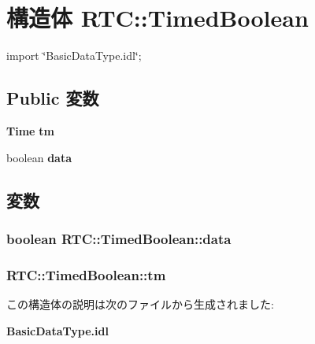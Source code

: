 \section{構造体 RTC::TimedBoolean}
\label{structRTC_1_1TimedBoolean}


{\ttfamily import \char`\"{}BasicDataType.idl\char`\"{};}

\subsection*{Public 変数}
\begin{DoxyCompactItemize}
\item 
{\bf Time} {\bf tm}
\item 
boolean {\bf data}
\end{DoxyCompactItemize}


\subsection{変数}
\subsubsection[{data}]{\setlength{\rightskip}{0pt plus 5cm}boolean {\bf RTC::TimedBoolean::data}}\label{structRTC_1_1TimedBoolean_a13a5e2dcf6f1f84895268e835a1a504c}
\subsubsection[{tm}]{ {\bf RTC::TimedBoolean::tm}}\label{structRTC_1_1TimedBoolean_aa07e1f41460e4542fe94af48e0e0135e}


この構造体の説明は次のファイルから生成されました:\begin{DoxyCompactItemize}
\item 
{\bf BasicDataType.idl}\end{DoxyCompactItemize}
